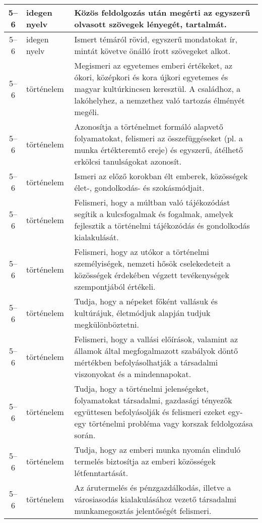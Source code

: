 \begin{small}
\begin{longtable}{c | p{2cm} |  p{11cm} }
              5--6 & idegen nyelv & Közös feldolgozás után megérti az egyszerű olvasott szövegek lényegét, tartalmát. \\ \hline
              5--6 & idegen nyelv & Ismert témáról rövid, egyszerű mondatokat ír, mintát követve önálló írott szövegeket alkot. \\ \hline
              5--6 & történelem & Megismeri az egyetemes emberi értékeket, az ókori, középkori és kora újkori egyetemes és magyar kultúrkincsen keresztül. A családhoz, a lakóhelyhez, a nemzethez való tartozás élményét megéli. \\ \hline
              5--6 & történelem & Azonosítja a történelmet formáló alapvető folyamatokat, felismeri az összefüggéseket (pl. a munka értékteremtő ereje) és egyszerű, átélhető erkölcsi tanulságokat azonosít. \\ \hline
              5--6 & történelem & Ismeri az előző korokban élt emberek, közösségek élet-, gondolkodás- és szokásmódjait. \\ \hline
              5--6 & történelem & Felismeri, hogy a múltban való tájékozódást segítik a kulcsfogalmak és fogalmak, amelyek fejlesztik a történelmi tájékozódás és gondolkodás kialakulását. \\ \hline
              5--6 & történelem & Felismeri, hogy az utókor a történelmi személyiségek, nemzeti hősök cselekedeteit a közösségek érdekében végzett tevékenységek szempontjából értékeli. \\ \hline
              5--6 & történelem & Tudja, hogy a népeket főként vallásuk és kultúrájuk, életmódjuk alapján tudjuk megkülönböztetni. \\ \hline
              5--6 & történelem & Felismeri, hogy a vallási előírások, valamint az államok által megfogalmazott szabályok döntő mértékben befolyásolhatják a társadalmi viszonyokat és a mindennapokat. \\ \hline
              5--6 & történelem & Tudja, hogy a történelmi jelenségeket, folyamatokat társadalmi, gazdasági tényezők együttesen befolyásolják és felismeri ezeket egy-egy történelmi probléma vagy korszak feldolgozása során. \\ \hline
              5--6 & történelem & Tudja, hogy az emberi munka nyomán elinduló termelés biztosítja az emberi közösségek létfenntartását. \\ \hline
              5--6 & történelem & Az árutermelés és pénzgazdálkodás, illetve a városiasodás kialakulásához vezető társadalmi munkamegosztás jelentőségét felismeri. \\ \hline

\end{longtable}
\end{small}

